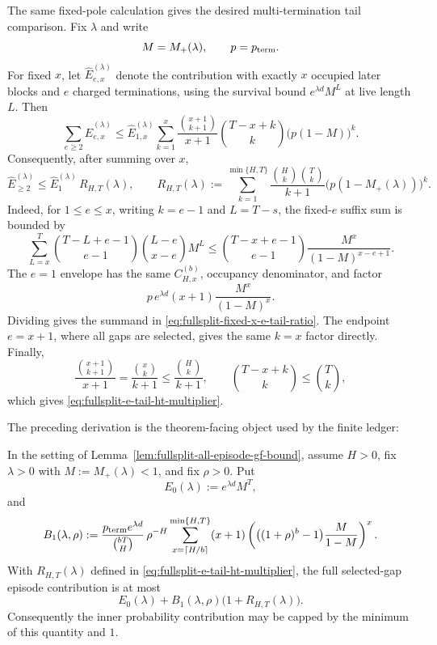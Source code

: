 The same fixed-pole calculation gives the desired multi-termination tail comparison.  Fix \(\lambda\) and write
\[
M=M_+(\lambda),\qquad p=p_{\rm term}.
\]
For fixed \(x\), let \(\widehat E_{e,x}^{(\lambda)}\) denote the contribution with exactly \(x\) occupied later blocks
and \(e\) charged terminations, using the survival bound \(e^{\lambda d}M^L\) at live length \(L\).  Then
\begin{equation}
\label{eq:fullsplit-fixed-x-e-tail-ratio}
\sum_{e\ge2}\widehat E_{e,x}^{(\lambda)}
\le
\widehat E_{1,x}^{(\lambda)}
\sum_{k=1}^{x}
\frac{\binom{x+1}{k+1}}{x+1}
\binom{T-x+k}{k}
\bigl(p(1-M)\bigr)^k .
\end{equation}
Consequently, after summing over \(x\),
\begin{equation}
\label{eq:fullsplit-e-tail-ht-multiplier}
\widehat E_{\ge2}^{(\lambda)}
\le
\widehat E_{1}^{(\lambda)}\,
R_{H,T}(\lambda),
\qquad
R_{H,T}(\lambda):=
\sum_{k=1}^{\min\{H,T\}}
\frac{\binom{H}{k}\binom{T}{k}}{k+1}
\bigl(p(1-M_+(\lambda))\bigr)^k .
\end{equation}
Indeed, for \(1\le e\le x\), writing \(k=e-1\) and \(L=T-s\), the fixed-\(e\) suffix sum is bounded by
\[
\sum_{L=x}^{T}
\binom{T-L+e-1}{e-1}
\binom{L-e}{x-e}M^L
\le
\binom{T-x+e-1}{e-1}
\frac{M^x}{(1-M)^{x-e+1}}.
\]
The \(e=1\) envelope has the same \(C_{H,x}^{(b)}\), occupancy denominator, and factor
\[
p\,e^{\lambda d}(x+1)\frac{M^x}{(1-M)^x}.
\]
Dividing gives the summand in \eqref{eq:fullsplit-fixed-x-e-tail-ratio}.  The endpoint \(e=x+1\), where all gaps are
selected, gives the same \(k=x\) factor directly.  Finally,
\[
\frac{\binom{x+1}{k+1}}{x+1}=\frac{\binom{x}{k}}{k+1}\le \frac{\binom{H}{k}}{k+1},
\qquad
\binom{T-x+k}{k}\le \binom{T}{k},
\]
which gives \eqref{eq:fullsplit-e-tail-ht-multiplier}.

The preceding derivation is the theorem-facing object used by the finite ledger:

\begin{lemma}
\label{lem:fullsplit-fixed-pole-eallratio}
In the setting of Lemma~\ref{lem:fullsplit-all-episode-gf-bound}, assume \(H>0\), fix \(\lambda>0\) with
\(M:=M_+(\lambda)<1\), and fix \(\rho>0\).  Put
\[
E_0(\lambda):=e^{\lambda d}M^T,
\]
and
\[
B_1(\lambda,\rho):=
\frac{p_{\rm term}e^{\lambda d}}{\binom{bT}{H}}\,
\rho^{-H}
\sum_{x=\lceil H/b\rceil}^{\min\{H,T\}}
(x+1)
\left(
\big((1+\rho)^b-1\big)\frac{M}{1-M}
\right)^x .
\]
With \(R_{H,T}(\lambda)\) defined in \eqref{eq:fullsplit-e-tail-ht-multiplier}, the full selected-gap episode
contribution is at most
\[
E_0(\lambda)+B_1(\lambda,\rho)\bigl(1+R_{H,T}(\lambda)\bigr).
\]
Consequently the inner probability contribution may be capped by the minimum of this quantity and \(1\).
\end{lemma}

